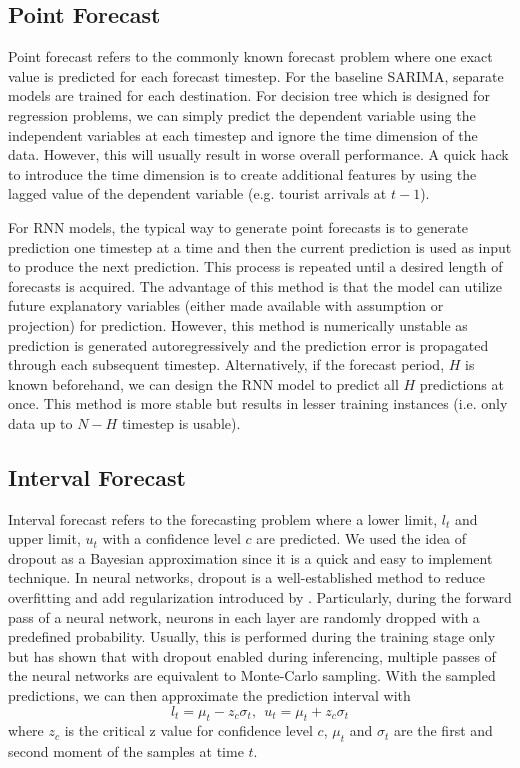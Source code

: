 \documentclass{article}
\begin{document}
\subsection{Point Forecast}
Point forecast refers to the commonly known forecast problem where one exact value is predicted for each forecast timestep. For the baseline SARIMA, separate models are trained for each destination. For decision tree which is designed for regression problems, we can simply predict the dependent variable using the independent variables at each timestep and ignore the time dimension of the data. However, this will usually result in worse overall performance. A quick hack to introduce the time dimension is to create additional features by using the lagged value of the dependent variable (e.g. tourist arrivals at $t-1$). 

For RNN models, the typical way to generate point forecasts is to generate prediction one timestep at a time and then the current prediction is used as input to produce the next prediction. This process is repeated until a desired length of forecasts is acquired. The advantage of this method is that the model can utilize future explanatory variables (either made available with assumption or projection) for prediction. However, this method is numerically unstable as prediction is generated autoregressively and the prediction error is propagated through each subsequent timestep. Alternatively, if the forecast period, $H$ is known beforehand, we can design the RNN model to predict all $H$ predictions at once. This method is more stable but results in lesser training instances (i.e. only data up to $N-H$ timestep is usable). 

\subsection{Interval Forecast}
Interval forecast refers to the forecasting problem where a lower limit, $l_t$ and upper limit, $u_t$ with a confidence level $c$ are predicted. We used the idea of dropout as a Bayesian approximation \cite{bayesiandropout} since it is a quick and easy to implement technique. In neural networks, dropout is a well-established method to reduce overfitting and add regularization introduced by \cite{dropout}. Particularly, during the forward pass of a neural network, neurons in each layer are randomly dropped with a predefined probability. Usually, this is performed during the training stage only but \cite{bayesiandropout} has shown that with dropout enabled during inferencing, multiple passes of the neural networks are equivalent to Monte-Carlo sampling. With the sampled predictions, we can then approximate the prediction interval with
\[
l_t = \mu_t - z_{c}\sigma_t, \ \ u_t = \mu_t + z_{c}\sigma_t
\]
where $z_{c}$ is the critical z value for confidence level $c$, $\mu_t$ and $\sigma_t$ are the first and second moment of the samples at time $t$.
\end{document}
